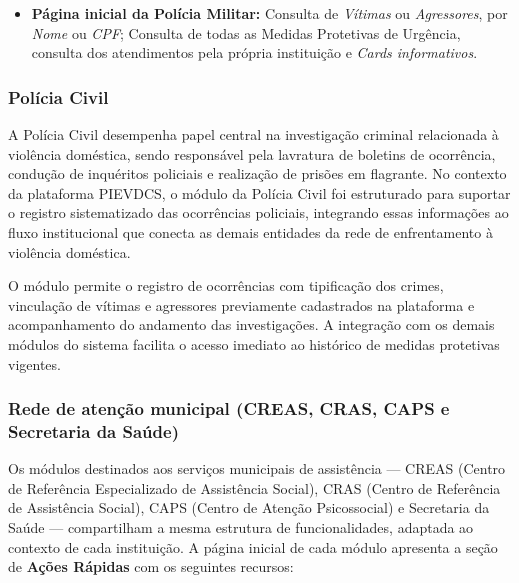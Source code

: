 \begin{itemize}
   \item \textbf{Página inicial da Polícia Militar:} Consulta de \textit{Vítimas} ou \textit{Agressores}, por \textit{Nome} ou \textit{CPF}; Consulta de todas as Medidas Protetivas de Urgência, consulta dos atendimentos pela própria instituição e \textit{Cards informativos}.
\end{itemize}

\subsubsection{Polícia Civil}

\par A Polícia Civil desempenha papel central na investigação criminal relacionada à violência doméstica, sendo responsável pela lavratura de boletins de ocorrência, condução de inquéritos policiais e realização de prisões em flagrante. No contexto da plataforma PIEVDCS, o módulo da Polícia Civil foi estruturado para suportar o registro sistematizado das ocorrências policiais, integrando essas informações ao fluxo institucional que conecta as demais entidades da rede de enfrentamento à violência doméstica.

\par O módulo permite o registro de ocorrências com tipificação dos crimes, vinculação de vítimas e agressores previamente cadastrados na plataforma e acompanhamento do andamento das investigações. A integração com os demais módulos do sistema facilita o acesso imediato ao histórico de medidas protetivas vigentes.

\subsubsection{Rede de atenção municipal (CREAS, CRAS, CAPS e Secretaria da Saúde)}
\par Os módulos destinados aos serviços municipais de assistência — CREAS (Centro de Referência Especializado de Assistência Social), CRAS (Centro de Referência de Assistência Social), CAPS (Centro de Atenção Psicossocial) e Secretaria da Saúde — compartilham a mesma estrutura de funcionalidades, adaptada ao contexto de cada instituição. A página inicial de cada módulo apresenta a seção de \textbf{Ações Rápidas} com os seguintes recursos:

